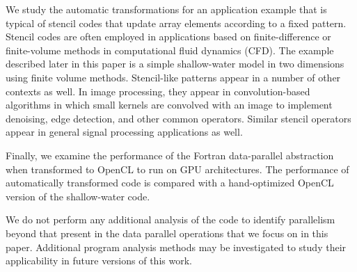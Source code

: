 We study the automatic transformations for an application example that is
typical of stencil codes that update array elements according to a fixed
pattern.  Stencil codes are often employed in applications based on
finite-difference or finite-volume methods in computational fluid dynamics
(CFD).  The example described later in this paper is a simple shallow-water
model in two dimensions using finite volume methods.  Stencil-like patterns
appear in a number of other contexts as well.  In image processing, they appear
in convolution-based algorithms in which small kernels are convolved with an image
to implement denoising, edge detection, and other common operators.  Similar stencil
operators appear in general signal processing applications as well.  

Finally, we examine the performance of the Fortran data-parallel abstraction
when transformed to OpenCL to run on GPU architectures.  The performance of
automatically transformed code is compared with a hand-optimized OpenCL
version of the shallow-water code.

We do not perform any additional analysis of the code to identify
parallelism beyond that present in the data parallel operations that we
focus on in this paper.  Additional program
analysis methods may be investigated to study their applicability
in future versions of this work.
